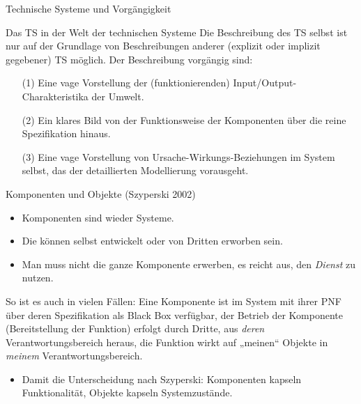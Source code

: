 \documentclass{beamer}
\begin{document}
\begin{frame}{Technische Systeme und Vorgängigkeit}
  \begin{block}{Das TS in der Welt der technischen Systeme}
    Die Beschreibung des TS selbst ist nur auf der Grundlage von
    Beschreibungen anderer (explizit oder implizit gegebener) TS möglich.  Der
    Beschreibung vorgängig sind:
    \begin{itemize}
    \item[(1)] Eine vage Vorstellung der (funktionierenden)
      Input/Output-Charakteristika der Umwelt.
    \item [(2)] Ein klares Bild von der Funktionsweise der Komponenten über
      die reine Spezifikation hinaus.
    \item [(3)] Eine vage Vorstellung von Ursache-Wirkungs-Beziehungen im
      System selbst, das der detaillierten Modellierung vorausgeht.
    \end{itemize}
  \end{block}
\end{frame}

\begin{frame}{Komponenten und Objekte}
  (Szyperski 2002)
  \begin{itemize}
  \item Komponenten sind wieder Systeme.
  \item Die können selbst entwickelt oder von Dritten erworben sein. 
  \item Man muss nicht die ganze Komponente erwerben, es reicht aus, den
    \emph{Dienst} zu nutzen.
  \end{itemize}
  So ist es auch in vielen Fällen: Eine Komponente ist im System mit ihrer PNF
  über deren Spezifikation als Black Box verfügbar, der Betrieb der Komponente
  (Bereitstellung der Funktion) erfolgt durch Dritte, aus \emph{deren}
  Verantwortungsbereich heraus, die Funktion wirkt auf „meinen“ Objekte in
  \emph{meinem} Verantwortungsbereich.
  \begin{itemize}
  \item Damit die Unterscheidung nach Szyperski: Komponenten kapseln
    Funktionalität, Objekte kapseln Systemzustände. 
  \end{itemize}
\end{frame}
\end{document}
